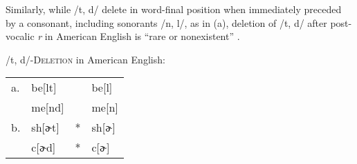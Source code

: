 \noindent
Similarly, while /t, d/ delete in word-final position when immediately preceded by a consonant, including sonorants /n, l/, as in (\nextx a), deletion of /t, d/ after post-vocalic \emph{r} in American English is ``rare or nonexistent'' \citep[][8]{Guy1980}.

\ex /t, d/-\textsc{Deletion} in American English: \\
\begin{tabular}{l l l@{} l}
a. & be[lt]  &   & be[l]  \\
   & me[nd]  &   & me[n]  \\
b. & sh[ɚt]  & * & sh[ɚ] \\
   & c[ɚd]   & * & c[ɚ]  \\
\end{tabular}
\xe

